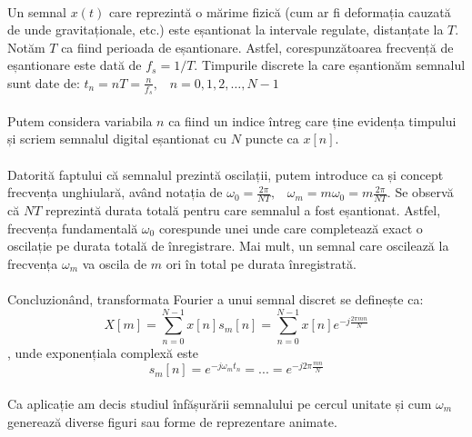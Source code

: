 \documentclass{article}
\begin{document}
\paragraph{} Un semnal \(x(t)\) care reprezintă o mărime fizică (cum ar fi deformația cauzată de unde gravitaționale, etc.) este eșantionat la intervale regulate, distanțate la \(T\). Notăm \(T\) ca fiind perioada de eșantionare. Astfel, corespunzătoarea frecvență de eșantionare este dată de \(f_s = 1/T\). Timpurile discrete la care eșantionăm semnalul sunt date de:
\(t_n = nT = \frac{n}{f_s} \text{,}  \quad n = 0, 1, 2, \ldots, N-1\)

\paragraph{} Putem considera variabila \(n\) ca fiind un indice întreg care ține evidența timpului și scriem semnalul digital eșantionat cu \(N\) puncte ca \(x[n]\).

\paragraph{} Datorită faptului că semnalul prezintă oscilații, putem introduce ca și concept frecvența unghiulară, având notația de \(\omega_0 = \frac{2 \pi}{N T} \text{,} \quad \omega_m = m \omega_0 = m \frac{2 \pi}{N T}\). Se observă că \(NT\) reprezintă durata totală pentru care semnalul a fost eșantionat. Astfel, frecvența fundamentală \(\omega_0\) corespunde unei unde care completează exact o oscilație pe durata totală de înregistrare. Mai mult, un semnal care oscilează la frecvența \(\omega_m\) va oscila de \(m\) ori în total pe durata înregistrată.

\paragraph{} Concluzionând, transformata Fourier a unui semnal discret se definește ca:
\[
X[m] = \sum_{n=0}^{N-1} x[n] s_m[n] = \sum_{n=0}^{N-1} x[n] e^{-j \frac{2 \pi m n}{N}}
\]
, unde exponențiala complexă este
\[
s_m[n] = e^{-j \omega_m t_n} = ... = e^{-j 2 \pi \frac{m n}{N}}
\]

\paragraph{} Ca aplicație am decis studiul înfășurării semnalului pe cercul unitate și cum \(\omega_m\) generează diverse figuri sau forme de reprezentare animate. 
\end{document}
